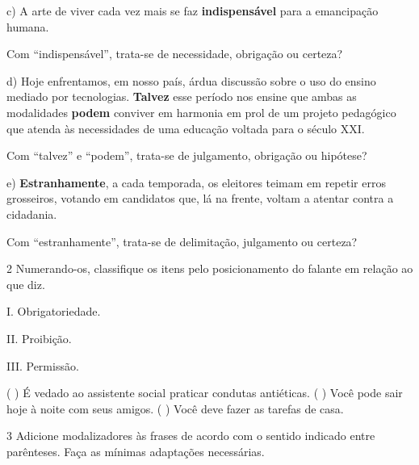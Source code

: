 
c) A arte de viver cada vez mais se faz \textbf{indispensável} para a
emancipação humana.

Com ``indispensável'', trata-se de necessidade, obrigação ou certeza?


d) Hoje enfrentamos, em nosso país, árdua discussão sobre o uso do
ensino mediado por tecnologias. \textbf{Talvez} esse período nos ensine
que ambas as modalidades \textbf{podem} conviver em harmonia em prol de
um projeto pedagógico que atenda às necessidades de uma educação voltada
para o século XXI.

Com ``talvez'' e ``podem'', trata-se de julgamento, obrigação ou hipótese?


e) \textbf{Estranhamente}, a cada temporada, os eleitores teimam em
repetir erros grosseiros, votando em candidatos que, lá na frente,
voltam a atentar contra a cidadania.

Com ``estranhamente'', trata-se de delimitação, julgamento ou certeza?


\num{2} Numerando-os, classifique os itens pelo posicionamento do
falante em relação ao que diz.

\begin{multicols}{2}

I. Obrigatoriedade. 

II. Proibição. 

III. Permissão.

\columnbreak

(  ) É vedado ao assistente social praticar condutas
antiéticas. 
(  ) Você pode sair hoje à noite com seus
amigos. 
(  ) Você deve fazer as tarefas de casa.
\end{multicols}

\num{3} Adicione modalizadores às frases de acordo com o sentido
indicado entre parênteses. Faça as mínimas adaptações necessárias.

